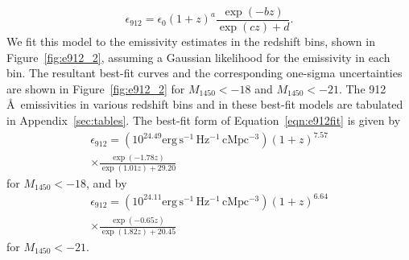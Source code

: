\documentclass[fleqn,usenatbib]{mnras}
\begin{document}
\begin{equation}
  \epsilon_{912}=\epsilon_0(1+z)^a\frac{\exp(-bz)}{\exp(cz)+d}.
  \label{eqn:e912fit}
\end{equation}
We fit this model to the emissivity estimates in the redshift bins,
shown in Figure~\ref{fig:e912_2}, assuming a Gaussian likelihood for
the emissivity in each bin.  The resultant best-fit curves and the
corresponding one-sigma uncertainties are shown in
Figure~\ref{fig:e912_2} for $M_{1450}<-18$ and $M_{1450}<-21$.  The
912\,\AA\ emissivities in various redshift bins and in these best-fit
models are tabulated in Appendix~\ref{sec:tables}.  The best-fit
form of Equation~\ref{eqn:e912fit} is given by
\begin{multline}
  \epsilon_{912}=(10^{24.49}\mathrm{erg\, s^{-1}\, Hz^{-1}\, cMpc^{-3}})(1+z)^{7.57}\\\times\frac{\exp(-1.78z)}{\exp(1.01z)+29.20}
\end{multline}
for $M_{1450}<-18$, and by 
\begin{multline}
  \epsilon_{912}=(10^{24.11}\mathrm{erg\, s^{-1}\, Hz^{-1}\, cMpc^{-3}})(1+z)^{6.64}\\\times\frac{\exp(-0.65z)}{\exp(1.82z)+20.45}
\end{multline}
for $M_{1450}<-21$.

\end{document}
